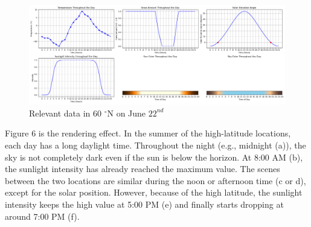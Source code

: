 \documentclass{article}
\begin{document}
\begin{figure}[h]
  \centering
  \begin{minipage}{1.00\textwidth}
      \centering
      \includegraphics[width=\textwidth]{images/Plot60S.png}
      \caption{Relevant data in 60 $^{\circ}$N on June \(22^{nd}\)}
      \label{fig:Plot60S}
  \end{minipage}
\end{figure}

Figure 6 is the rendering effect. In the summer of the high-latitude locations, each day has a long daylight time. Throughout the 
night (e.g., midnight (a)), the sky is not completely dark even if the sun is below the horizon. At 8:00 AM (b), the sunlight 
intensity has already reached the maximum value. The scenes between the two locations are similar during the noon or afternoon time 
(c or d), except for the solar position. However, because of the high latitude, the sunlight intensity keeps the high value at 5:00 
PM (e) and finally starts dropping at around 7:00 PM (f).
\end{document}
